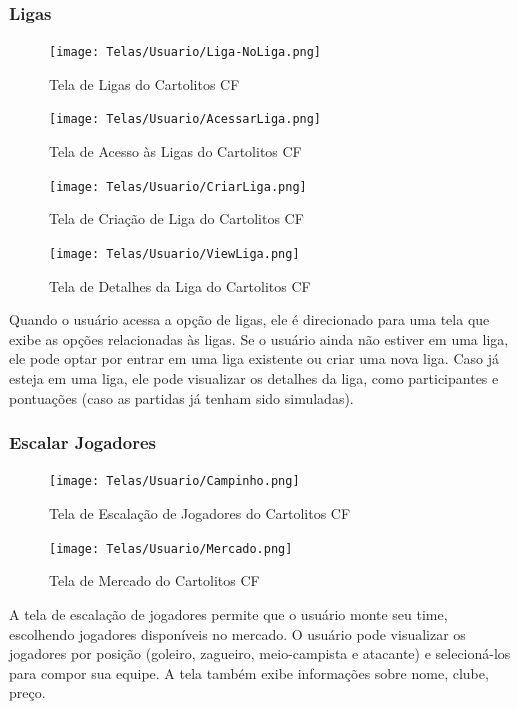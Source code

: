 \documentclass[12pt]{article}
\begin{document}
\subsubsection{Ligas}
\label{sec:ligasUsr}

\begin{figure}[H]
  \centering
  \texttt{[image: Telas/Usuario/Liga-NoLiga.png]}
  \caption{Tela de Ligas do Cartolitos CF}
  \label{fig:ligas}
\end{figure}

\begin{figure}[H]
  \centering
  \texttt{[image: Telas/Usuario/AcessarLiga.png]}
  \caption{Tela de Acesso às Ligas do Cartolitos CF}
  \label{fig:liga_acessar}
\end{figure}

\begin{figure}[H]
  \centering
  \texttt{[image: Telas/Usuario/CriarLiga.png]}
  \caption{Tela de Criação de Liga do Cartolitos CF}
  \label{fig:liga_criar}
\end{figure}

\begin{figure}[H]
  \centering
  \texttt{[image: Telas/Usuario/ViewLiga.png]}
  \caption{Tela de Detalhes da Liga do Cartolitos CF}
  \label{fig:liga_detalhes}
\end{figure}

Quando o usuário acessa a opção de ligas, ele é direcionado para uma tela que exibe as opções relacionadas às ligas. Se o usuário ainda não estiver em uma liga, ele pode optar por entrar em uma liga existente ou criar uma nova liga. Caso já esteja em uma liga, ele pode visualizar os detalhes da liga, como participantes e pontuações (caso as partidas já tenham sido simuladas).

\subsubsection{Escalar Jogadores}
\label{sec:escalar_jogadores}
\begin{figure}[H]
  \centering
  \texttt{[image: Telas/Usuario/Campinho.png]}
  \caption{Tela de Escalação de Jogadores do Cartolitos CF}
  \label{fig:escalar_jogadores}
\end{figure}

\begin{figure}[H]
  \centering
  \texttt{[image: Telas/Usuario/Mercado.png]}
  \caption{Tela de Mercado do Cartolitos CF}
  \label{fig:mercado}
\end{figure}
A tela de escalação de jogadores permite que o usuário monte seu time, escolhendo jogadores disponíveis no mercado. O usuário pode visualizar os jogadores por posição (goleiro, zagueiro, meio-campista e atacante) e selecioná-los para compor sua equipe. A tela também exibe informações sobre nome, clube, preço.
\end{document}
